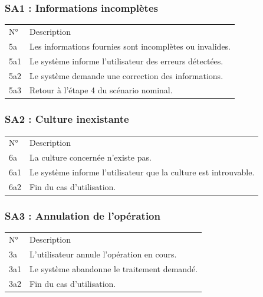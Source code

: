 \documentclass[
]{book}
\begin{document}
\hypertarget{sa1-informations-incompluxe8tes}{%
\subsubsection{SA1 : Informations
incomplètes}\label{sa1-informations-incompluxe8tes}}

\begin{longtable}[]{@{}ll@{}}
\toprule
\endhead
N° & Description \\
5a & Les informations fournies sont incomplètes ou invalides. \\
5a1 & Le système informe l'utilisateur des erreurs détectées. \\
5a2 & Le système demande une correction des informations. \\
5a3 & Retour à l'étape 4 du scénario nominal. \\
\bottomrule
\end{longtable}

\hypertarget{sa2-culture-inexistante}{%
\subsubsection{SA2 : Culture
inexistante}\label{sa2-culture-inexistante}}

\begin{longtable}[]{@{}ll@{}}
\toprule
\endhead
N° & Description \\
6a & La culture concernée n'existe pas. \\
6a1 & Le système informe l'utilisateur que la culture est
introuvable. \\
6a2 & Fin du cas d'utilisation. \\
\bottomrule
\end{longtable}

\hypertarget{sa3-annulation-de-lopuxe9ration}{%
\subsubsection{SA3 : Annulation de
l'opération}\label{sa3-annulation-de-lopuxe9ration}}

\begin{longtable}[]{@{}ll@{}}
\toprule
\endhead
N° & Description \\
3a & L'utilisateur annule l'opération en cours. \\
3a1 & Le système abandonne le traitement demandé. \\
3a2 & Fin du cas d'utilisation. \\
\bottomrule
\end{longtable}
\end{document}
